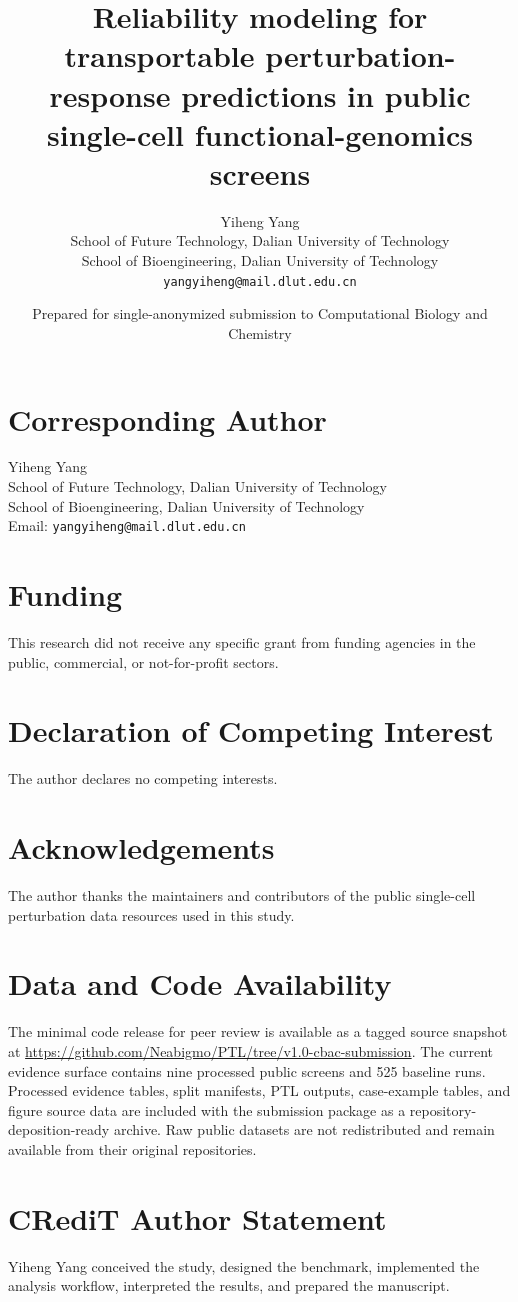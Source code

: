 \documentclass[11pt]{article}
\title{Reliability modeling for transportable perturbation-response predictions in public single-cell functional-genomics screens}
\author{Yiheng Yang\\
School of Future Technology, Dalian University of Technology\\
School of Bioengineering, Dalian University of Technology\\
\texttt{yangyiheng@mail.dlut.edu.cn}}
\date{Prepared for single-anonymized submission to Computational Biology and Chemistry}
\begin{document}
\maketitle

\section*{Corresponding Author}
Yiheng Yang\\
School of Future Technology, Dalian University of Technology\\
School of Bioengineering, Dalian University of Technology\\
Email: \texttt{yangyiheng@mail.dlut.edu.cn}

\section*{Funding}
This research did not receive any specific grant from funding agencies in the public, commercial, or not-for-profit sectors.

\section*{Declaration of Competing Interest}
The author declares no competing interests.

\section*{Acknowledgements}
The author thanks the maintainers and contributors of the public single-cell perturbation data resources used in this study.

\section*{Data and Code Availability}
The minimal code release for peer review is available as a tagged source snapshot at \url{https://github.com/Neabigmo/PTL/tree/v1.0-cbac-submission}. The current evidence surface contains nine processed public screens and 525 baseline runs. Processed evidence tables, split manifests, PTL outputs, case-example tables, and figure source data are included with the submission package as a repository-deposition-ready archive. Raw public datasets are not redistributed and remain available from their original repositories.

\section*{CRediT Author Statement}
Yiheng Yang conceived the study, designed the benchmark, implemented the analysis workflow, interpreted the results, and prepared the manuscript.
\end{document}
